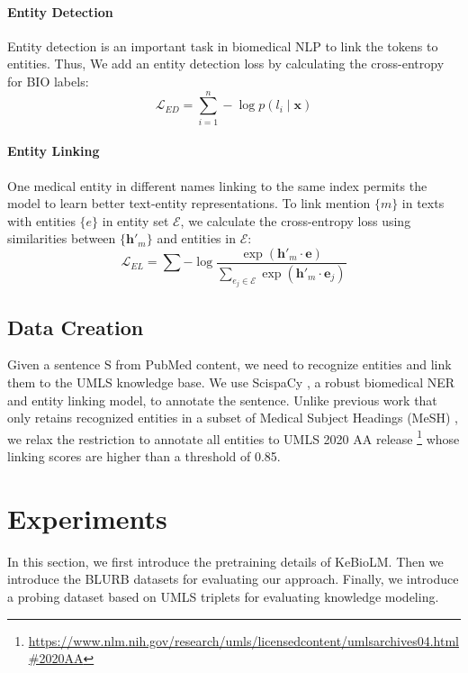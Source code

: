 \documentclass[11pt]{article}
\begin{document}
\paragraph{Entity Detection}
Entity detection is an important task in biomedical NLP to link the tokens to entities. Thus, We add an entity detection loss by calculating the cross-entropy for BIO labels:
\begin{equation}
    \mathcal{L}_{ED} = \sum_{i=1}^n -\log p(l_i\mid \mathbf{x})
\end{equation}


\paragraph{Entity Linking}
One medical entity in different names linking to the same index permits the model to learn better text-entity representations.
To link mention $\{m\}$ in texts with entities $\{e\}$ in entity set $\mathcal{E}$, we calculate the cross-entropy loss using similarities between $\{\mathbf{h}'_m\}$ and entities in $\mathcal{E}$:
\begin{equation}
    \mathcal{L}_{EL} = \sum -\log\frac{\exp(\mathbf{h}'_m\cdot \mathbf{e})}{\sum_{e_j\in\mathcal{E}}\exp(\mathbf{h}'_m\cdot \mathbf{e}_j)}
\end{equation}





\subsection{Data Creation}

Given a sentence $\mathrm{S}$ from PubMed content, we need to recognize entities and link them to the UMLS knowledge base. We use ScispaCy \cite{neumann-etal-2019-scispacy}, a robust biomedical NER and entity linking model, to annotate the sentence. Unlike previous work \cite{vashishth2020medtype} that only retains recognized entities in a subset of Medical Subject Headings (MeSH) \cite{lipscomb2000medical}, we relax the restriction to annotate all entities to UMLS 2020 AA release \footnote{\url{https://www.nlm.nih.gov/research/umls/licensedcontent/umlsarchives04.html\#2020AA}} whose linking scores are higher than a threshold of 0.85.






\section{Experiments}
In this section, we first introduce the pretraining details of KeBioLM. 
Then we introduce the BLURB datasets for evaluating our approach.
Finally, we introduce a probing dataset based on UMLS triplets for evaluating knowledge modeling.
\end{document}
